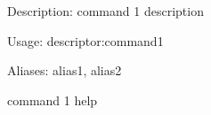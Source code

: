 
\begin{DoxyItemize}
\item Description\+: command 1 description
\item Usage\+: {\ttfamily descriptor\+:command1}
\item Aliases\+: {\ttfamily alias1}, {\ttfamily alias2}
\end{DoxyItemize}

command 1 help 